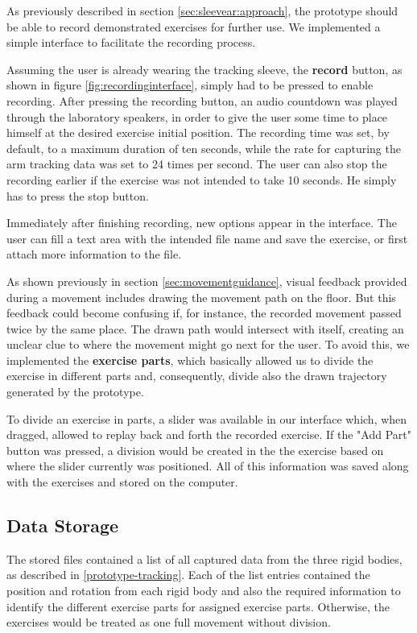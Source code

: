 As previously described in section \ref{sec:sleevear:approach}, the prototype should be able to record demonstrated exercises for further use.
We implemented a simple interface to facilitate the recording process.

Assuming the user is already wearing the tracking sleeve, the \textbf{record} button, as shown in figure \ref{fig:recordinginterface}, simply had to be pressed to enable recording. 
After pressing the recording button, an audio countdown was played through the laboratory speakers, in order to give the user some time to place himself at the desired exercise initial position. 
The recording time was set, by default, to a maximum duration of ten seconds, while the rate for capturing the arm tracking data was set to 24 times per second.
The user can also stop the recording earlier if the exercise was not intended to take 10 seconds. He simply has to press the stop button.

Immediately after finishing recording, new options appear in the interface. 
The user can fill a text area with the intended file name and save the exercise, or first attach more information to the file.

As shown previously in section \ref{sec:movementguidance}, visual feedback provided during a movement includes drawing the movement path on the floor. 
But this feedback could become confusing if, for instance, the recorded movement passed twice by the same place. 
The drawn path would intersect with itself, creating an unclear clue to where the movement might go next for the user. 
To avoid this, we implemented the \textbf{exercise parts}, which basically allowed us to divide the exercise in different parts and, consequently, divide also the drawn trajectory generated by the prototype.

To divide an exercise in parts, a slider was available in our interface which, when dragged, allowed to replay back and forth the recorded exercise. 
If the "Add Part" button was pressed, a division would be created in the the exercise based on where the slider currently was positioned.
All of this information was saved along with the exercises and stored on the computer.



\subsection{Data Storage}

The stored files contained a list of all captured data from the three rigid bodies, as described in \ref{prototype-tracking}. 
Each of the list entries contained the position and rotation from each rigid body and also the required information to identify the different exercise parts for assigned exercise parts. Otherwise, the exercises would be treated as one full movement without division.

